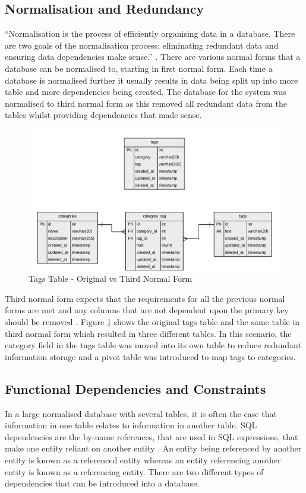 \subsection{Normalisation and Redundancy}
\label{SubSection:Database_Normalisation}
``Normalisation is the process of efficiently organising data in a database. There are two goals of the normalisation process: eliminating redundant data and ensuring data dependencies make sense.'' \cite{Databases:NormalisationBasics}. There are various normal forms that a database can be normalised to, starting in first normal form. Each time a database is normalised further it usually results in data being split up into more table and more dependencies being created. The database for the system was normalised to third normal form as this removed all redundant data from the tables whilst providing dependencies that made sense.

\begin{figure}[H]
    \centering
    \includegraphics[width=1.0\textwidth]{Images/Design/Database/3NF_Tags}
    \caption{Tags Table - Original vs Third Normal Form} \label{fig:3NF_Tags}
\end{figure}

Third normal form expects that the requirements for all the previous normal forms are met and any columns that are not dependent upon the primary key should be removed \cite{Databases:NormalisationBasics}. Figure \ref{fig:3NF_Tags} shows the original tags table and the same table in third normal form which resulted in three different tables. In this scenario, the category field in the tags table was moved into its own table to reduce redundant information storage and a pivot table was introduced to map tags to categories.

\subsection{Functional Dependencies and Constraints}
\label{SubSection:Database_Constraints}
In a large normalised database with several tables, it is often the case that information in one table relates to information in another table. SQL dependencies are the by-name references, that are used in SQL expressions, that make one entity reliant on another entity \cite{Microsoft:Dependencies}. An entity being referenced by another entity is known as a referenced entity whereas an entity referencing another entity is known as a referencing entity. There are two different types of dependencies that can be introduced into a database.


